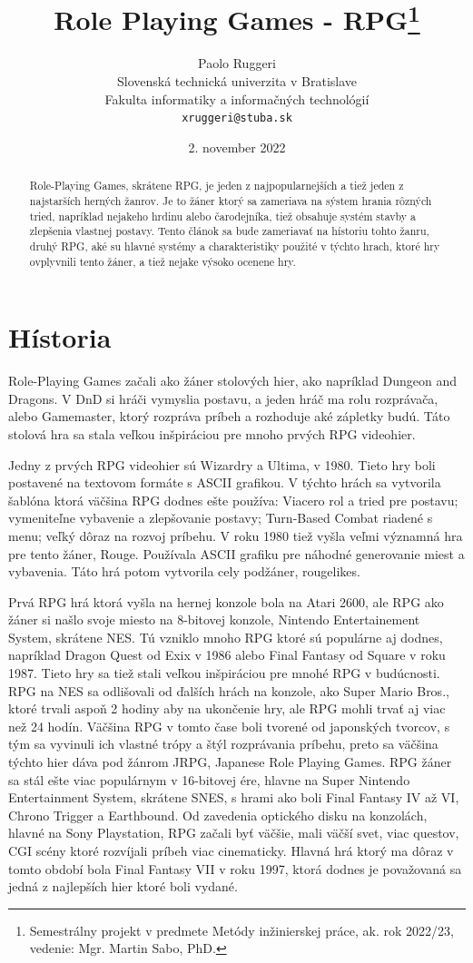 \documentclass [10pt, twoside, slovak, a4paper] {article}
\title{Role Playing Games - RPG\thanks{Semestrálny projekt v predmete Metódy inžinierskej práce, ak. rok 2022/23, vedenie: Mgr. Martin Sabo, PhD.}}
\author{Paolo Ruggeri\\[2pt]
	{\small Slovenská technická univerzita v Bratislave}\\
	{\small Fakulta informatiky a informačných technológií}\\
	{\small \texttt{xruggeri@stuba.sk}}
	}
\date {\small 2. november 2022}
\begin{document}
\maketitle

\begin{abstract}
Role-Playing Games, skrátene RPG, je jeden z najpopularnejších a tiež jeden z najstarších herných žanrov. 
Je to žáner ktorý sa zameriava na sýstem hrania rôzných tried, napríklad nejakeho hrdinu alebo čarodejníka, tiež obsahuje systém stavby a zlepšenia vlastnej postavy.
Tento článok sa bude zameriavať na hístoriu tohto žanru, druhý RPG, aké su hlavné systémy a charakteristiky použité v týchto hrach, ktoré hry ovplyvnili tento žáner, a tiež nejake výsoko ocenene hry.
\end {abstract}

\section{Hístoria}

Role-Playing Games začali ako žáner stolových hier, ako napríklad Dungeon and Dragons. V DnD si hráči vymyslia postavu, a jeden hráč ma rolu rozprávača, alebo Gamemaster, ktorý rozpráva príbeh a rozhoduje aké zápletky budú. Táto stolová hra sa stala veľkou inšpiráciou pre mnoho prvých RPG videohier.

Jedny z prvých RPG videohier sú Wizardry a Ultima, v 1980. Tieto hry boli postavené na textovom formáte s ASCII grafikou. V týchto hrách sa vytvorila šablóna ktorá väčšina RPG dodnes ešte používa: Viacero rol a tried pre postavu; vymeniteľne vybavenie a zlepšovanie postavy; Turn-Based Combat riadené s menu; veľký dôraz na rozvoj príbehu. V roku 1980 tiež vyšla veľmi významná hra pre tento žáner, Rouge. Používala ASCII grafiku pre náhodné generovanie miest a vybavenia. Táto hrá potom vytvorila cely podžáner, rougelikes.

Prvá RPG hrá ktorá vyšla na hernej konzole bola na Atari 2600, ale RPG ako žáner si našlo svoje miesto na 8-bitovej konzole, Nintendo Entertainement System, skrátene NES. Tú vzniklo mnoho RPG ktoré sú populárne aj dodnes, napríklad Dragon Quest od Exix v 1986 alebo Final Fantasy od Square v roku 1987. Tieto hry sa tiež stali veľkou inšpiráciou pre mnohé RPG v budúcnosti. RPG na NES sa odlišovali od ďalších hrách na konzole, ako Super Mario Bros., ktoré trvali aspoň 2  hodiny aby na ukončenie hry, ale RPG mohli trvať aj viac než 24 hodín. Väčšina RPG v tomto čase boli tvorené od japonských tvorcov, s tým sa vyvinuli ich vlastné trópy a štýl rozprávania príbehu, preto sa väčšina týchto hier dáva pod žánrom JRPG, Japanese Role Playing Games. 
RPG žáner sa stál ešte viac populárnym v 16-bitovej ére, hlavne na Super Nintendo Entertainment System, skrátene SNES, s hrami ako boli Final Fantasy IV až VI, Chrono Trigger a Earthbound. 
Od zavedenia optického disku na konzolách, hlavné na Sony Playstation, RPG začali byť väčšie, mali väčší svet, viac questov, CGI scény ktoré rozvíjali príbeh viac cinematicky. Hlavná hrá ktorý ma dôraz v tomto období bola Final Fantasy VII v roku 1997, ktorá dodnes je považovaná sa jedná z najlepších hier ktoré boli vydané.
\end{document}
